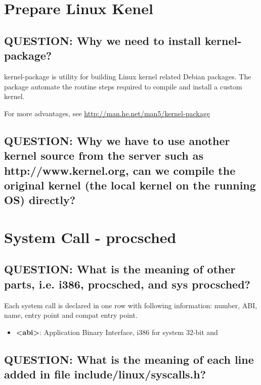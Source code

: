 \section{Prepare Linux Kenel}

\subsection{QUESTION: Why we need to install kernel-package?}

kernel-package is utility for building Linux kernel related Debian packages. The package automate the routine steps required to compile and install a custom kernel.

\noindent For more advantages, see \url{http://man.he.net/man5/kernel-package}

\subsection{QUESTION: Why we have to use another kernel source from the server such as http://www.kernel.org, can we compile the original kernel (the local kernel on the running OS) directly?}



\section{System Call - procsched}

\subsection{QUESTION: What is the meaning of other parts, i.e. i386, procsched, and sys procsched?}

Each system call is declared in one row with following information: number, ABI, name, entry point and compat entry point.

\begin{itemize}
	\item \textbf{<abi>}: Application Binary Interface, i386 for system 32-bit and
\end{itemize}


\subsection{QUESTION: What is the meaning of each line added in file include/linux/syscalls.h?}

